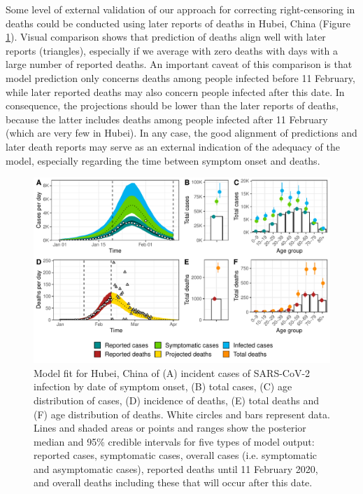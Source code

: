\documentclass{article}
\begin{document}
Some level of external validation of our approach for correcting right-censoring in deaths could be conducted using later reports of deaths in Hubei, China (Figure \ref{fig:mortality}).
Visual comparison shows that prediction of deaths align well with later reports (triangles), especially if we average with zero deaths with days with a large number of reported deaths.
An important caveat of this comparison is that model prediction only concerns deaths among people infected before 11 February, while later reported deaths may also concern people infected after this date.
In consequence, the projections should be lower than the later reports of deaths, because the latter includes deaths among people infected after 11 February (which are very few in Hubei).
In any case, the good alignment of predictions and later death reports may serve as an external indication of the adequacy of the model, especially regarding the time between symptom onset and deaths.

\begin{figure}[H]
	\includegraphics[width=\linewidth]{../format_output/figures_v3/external_validation_hubei.pdf}
	\caption{Model fit for Hubei, China of (A) incident cases of SARS-CoV-2 infection by date of symptom onset, (B) total cases, (C) age distribution of cases, (D) incidence of deaths, (E) total deaths and (F) age distribution of deaths. White circles and bars represent data. Lines and shaded areas or points and ranges show the posterior median and 95\% credible intervals for five types of model output: reported cases, symptomatic cases, overall cases (i.e. symptomatic and asymptomatic cases), reported deaths until 11 February 2020, and overall deaths including these that will occur after this date.}
	\label{fig:mortality}
\end{figure}
\end{document}
